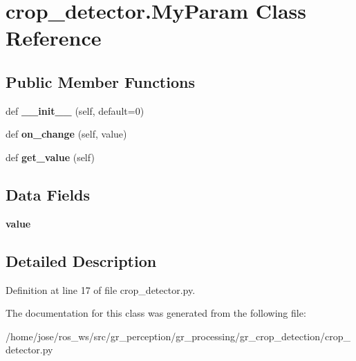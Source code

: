 \hypertarget{classcrop__detector_1_1MyParam}{}\section{crop\+\_\+detector.\+My\+Param Class Reference}
\label{classcrop__detector_1_1MyParam}
\subsection*{Public Member Functions}
\begin{DoxyCompactItemize}
\item 
\mbox{\label{classcrop__detector_1_1MyParam_a9786c3c37be17bd1d804e4c9473905d7}} 
def {\bfseries \+\_\+\+\_\+init\+\_\+\+\_\+} (self, default=0)
\item 
\mbox{\label{classcrop__detector_1_1MyParam_ac8137b3443e9655434a9304ba183d6b2}} 
def {\bfseries on\+\_\+change} (self, value)
\item 
\mbox{\label{classcrop__detector_1_1MyParam_afa260d00a6ce5c3413d628b48ff33ac7}} 
def {\bfseries get\+\_\+value} (self)
\end{DoxyCompactItemize}
\subsection*{Data Fields}
\begin{DoxyCompactItemize}
\item 
\mbox{\label{classcrop__detector_1_1MyParam_a1f8b814765f2816279188383d43e93c2}} 
{\bfseries value}
\end{DoxyCompactItemize}


\subsection{Detailed Description}


Definition at line 17 of file crop\+\_\+detector.\+py.



The documentation for this class was generated from the following file\+:\begin{DoxyCompactItemize}
\item 
/home/jose/ros\+\_\+ws/src/gr\+\_\+perception/gr\+\_\+processing/gr\+\_\+crop\+\_\+detection/crop\+\_\+detector.\+py\end{DoxyCompactItemize}

